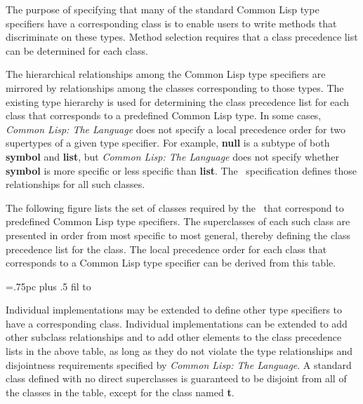 The purpose of specifying that many of the standard Common Lisp type
specifiers have a corresponding class is to enable users to write methods that
discriminate on these types.  
Method selection requires that a class precedence list can be
determined for each class. 

\vfill\eject
The hierarchical relationships among the Common Lisp type specifiers
are mirrored by relationships among the classes corresponding to those
types.  The existing type hierarchy is used for determining the
class precedence list for each class that corresponds to a predefined
Common Lisp type.  In some cases, {\it Common Lisp: The Language\/}
does not specify a local precedence order for two supertypes of a
given type specifier.  For example, {\bf null} is a subtype of both
{\bf symbol} and {\bf list}, but {\it Common Lisp: The Language\/}
does not specify whether {\bf symbol} is more specific or less
specific than {\bf list}.  The \CLOS\ specification defines those
relationships for all such classes.

The following figure lists the set of classes required by the \OS\
that correspond to predefined Common Lisp type specifiers.  The
superclasses of each such class are presented in order from most
specific to most general, thereby defining the class precedence list
for the class. The local precedence order for each class that
corresponds to a Common Lisp type specifier can be derived from this
table.

\boxfig
{=.75pc
\tabskip {} plus .5 fil
\halign to }
\caption{}
\endfig

Individual implementations may be extended to define other type
specifiers to have a corresponding class.  Individual implementations
can be extended to add other subclass relationships and to add other
elements to the class precedence lists in the above table, as long as
they do not violate the type relationships and disjointness
requirements specified by {\it Common Lisp: The Language\/}.
A standard class defined with no direct superclasses is guaranteed to
be disjoint from all of the classes in the table, except for the
class named {\bf t}.

